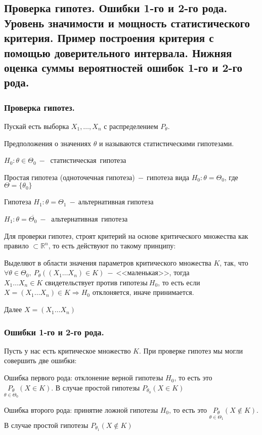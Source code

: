 \subsection{Проверка гипотез. Ошибки 1-го и 2-го рода. Уровень значимости и мощность статистического критерия. Пример построения критерия с помощью доверительного интервала. Нижняя оценка суммы вероятностей ошибок 1-го и 2-го рода.}

\subsubsection{Проверка гипотез.}

Пускай есть выборка $X_1,\ldots,X_n$ с распределением $P_{\theta}$.

\begin{definition*}
Предположения о значениях $\theta$ и называются статистическими гипотезами. 
\end{definition*}
\begin{example}
$H_0\colon\theta\in\Theta_0~-~$ статистическая\ гипотеза
\end{example}
\begin{definition*}
Простая гипотеза (одноточечная гипотеза)$~-~$гипотеза вида $H_{0}\colon\theta=\Theta_0$, где $\Theta=\{\theta_0\}$
\end{definition*}
\begin{definition*}Гипотеза $H_{1}\colon\theta=\Theta_1~-~$альтернативная гипотеза
\end{definition*}
\begin{example}
$H_1\colon\theta=\overline{\Theta_0}~-~$ альтернативная\ гипотеза
\end{example}

Для проверки гипотез, строят критерий на основе критического множества как правило $\subset \mathbb{R}^n$, то есть действуют по такому принципу:

Выделяют в области значения параметров критического множества $K$, так, что $\forall \theta \in\Theta_0,\ P_\theta((X_1\ldots X_n)\in K)~-~\text{<<маленькая>>}$, тогда 
$X_1\ldots X_n\in K\text{ свидетельствует против гипотезы}\ H_0$, то есть если $X=(X_1\ldots X_n)\in K\Rightarrow H_0$ отклоняется, иначе принимается.

Далее $X=(X_1\ldots X_n)$ 
\subsubsection{Ошибки 1-го и 2-го рода.}
Пусть у нас есть критическое множество $K$. При проверке гипотез мы могли совершить две ошибки:
\begin{definition*}
Ошибка первого рода: отклонение верной гипотезы $H_0$, то есть это $\underset{\theta\in\Theta_0}{P_\theta}(X\in K)$. В случае простой гипотезы $P_{\theta_0}(X\in K)$
\end{definition*}
\begin{definition*}
Ошибка второго рода: принятие ложной гипотезы $H_0$, то есть это $\underset{\theta\in\Theta_1}{P_\theta}(X\notin K)$. В случае простой гипотезы $P_{\theta_1}(X\notin K)$
\end{definition*}

